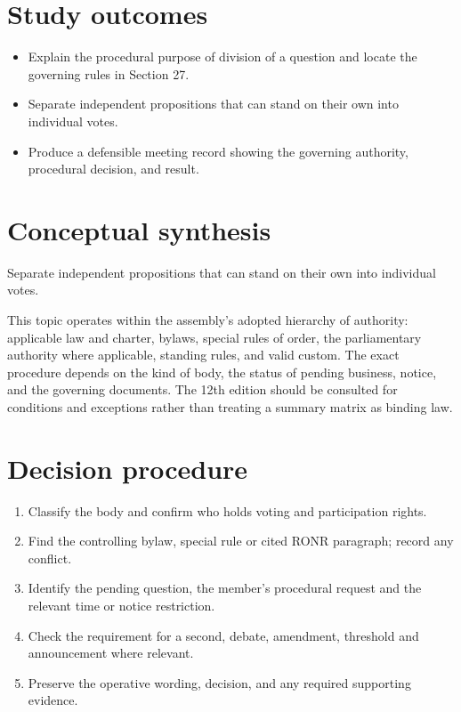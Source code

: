 \documentclass[11pt]{article}
\begin{document}
\SuiteOpen
{}
\section{Study outcomes}
\begin{itemize}[leftmargin=*,itemsep=4pt]
\item Explain the procedural purpose of division of a question and locate the governing rules in Section 27.
\item Separate independent propositions that can stand on their own into individual votes.
\item Produce a defensible meeting record showing the governing authority, procedural decision, and result.
\end{itemize}

\section{Conceptual synthesis}
Separate independent propositions that can stand on their own into individual votes.

This topic operates within the assembly’s adopted hierarchy of authority: applicable law and charter, bylaws, special rules of order, the parliamentary authority where applicable, standing rules, and valid custom. The exact procedure depends on the kind of body, the status of pending business, notice, and the governing documents. The 12th edition should be consulted for conditions and exceptions rather than treating a summary matrix as binding law.
\section{Decision procedure}
\begin{enumerate}[leftmargin=*,itemsep=4pt]
\item Classify the body and confirm who holds voting and participation rights.
\item Find the controlling bylaw, special rule or cited RONR paragraph; record any conflict.
\item Identify the pending question, the member’s procedural request and the relevant time or notice restriction.
\item Check the requirement for a second, debate, amendment, threshold and announcement where relevant.
\item Preserve the operative wording, decision, and any required supporting evidence.
\end{enumerate}
\end{document}
